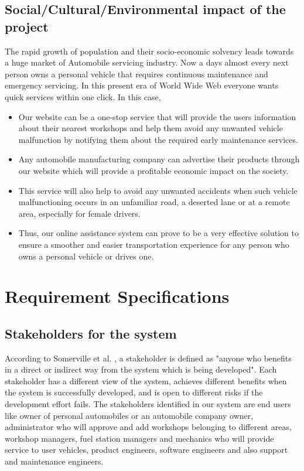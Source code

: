 \documentclass[11pt]{article} %
\begin{document}
	\subsection{Social/Cultural/Environmental impact of the project}
	The rapid growth of population and their socio-economic solvency leads towards a huge market of Automobile servicing industry. Now a days almost every next person owns a personal vehicle that requires continuous maintenance and emergency servicing. In this present era of World Wide Web everyone wants quick services within one click. In this case,
	\begin{itemize}
	\item Our website can be a one-stop service that will provide the users information about their nearest workshops and help them avoid any unwanted vehicle malfunction by notifying them about the required early maintenance services. 
	\item Any automobile manufacturing company can advertise their products through our website which will provide a profitable economic impact on the society.
	\item This service will also help to avoid any unwanted accidents when such vehicle malfunctioning occurs in an unfamiliar road, a deserted lane or at a remote area, especially for female drivers. 
	\item Thus, our online assistance system can prove to be a very effective solution to ensure a smoother and easier transportation experience for any person who owns a personal vehicle or drives one.   
	\end{itemize}
		
\section{Requirement Specifications}
	\subsection{Stakeholders for the system}
	According to Somerville et al. \cite{johnston1998requirements}, a stakeholder is defined as "anyone who benefits in a direct or indirect way from the system which is being developed". Each stakeholder has a different view of the system, achieves different benefits when the system is successfully  developed, and is open to different risks if the development effort fails. The stakeholders identified in our system are end users like owner of personal automobiles or an automobile company owner, administrator who will approve and add workshops belonging to different areas, workshop managers, fuel station managers and mechanics who will provide service to user vehicles, product engineers, software engineers and also support and maintenance engineers. 
\end{document}
